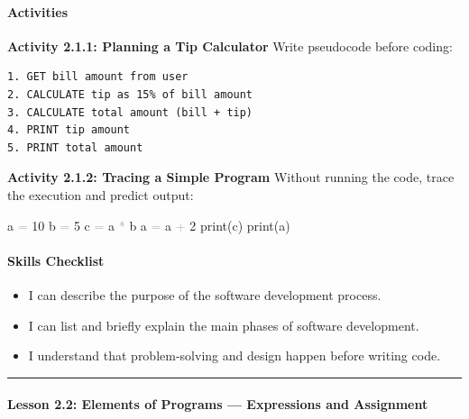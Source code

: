 \documentclass[
  justified,
  openright,
]{tufte-book}
\let\subsection\paragraph
\let\paragraph\paragraph
\newcommand{\CodeNumTok}[1]{\textcolor{CodeNumber}{#1}}             %
\newcommand{\OperatorTok}[1]{\textcolor{DarkGray}{#1}}              %
\newenvironment{Shaded}{%
  \begin{mdframed}[style=TufteCode]%
}{%
  \end{mdframed}%
}
\let\subsection\paragraph
\let\paragraph\paragraph
\providecommand{\tightlist}{%
  \setlength{\itemsep}{0pt}\setlength{\parskip}{0pt}}
\begin{document}
\subsection{Activities}\label{activities-3}

\textbf{Activity 2.1.1: Planning a Tip Calculator} Write pseudocode
before coding:

\begin{verbatim}
1. GET bill amount from user
2. CALCULATE tip as 15% of bill amount
3. CALCULATE total amount (bill + tip)
4. PRINT tip amount
5. PRINT total amount
\end{verbatim}

\textbf{Activity 2.1.2: Tracing a Simple Program} Without running the
code, trace the execution and predict output:

\begin{Shaded}
\begin{Highlighting}[]
a \OperatorTok{=} \CodeNumTok{10}
b \OperatorTok{=} \CodeNumTok{5}
c \OperatorTok{=} a \OperatorTok{*} b
a \OperatorTok{=} a \OperatorTok{+} \CodeNumTok{2}
print(c)
print(a)
\end{Highlighting}
\end{Shaded}

\subsection{Skills Checklist}\label{skills-checklist-7}

\begin{itemize}
\tightlist
\item[$\square$]
  I can describe the purpose of the software development process.
\item[$\square$]
  I can list and briefly explain the main phases of software
  development.
\item[$\square$]
  I understand that problem-solving and design happen before writing
  code.
\end{itemize}

\begin{center}\rule{0.5\linewidth}{0.5pt}\end{center}

\subsection{Lesson 2.2: Elements of Programs --- Expressions and
Assignment}\label{lesson-2.2-elements-of-programs-expressions-and-assignment}
\end{document}
